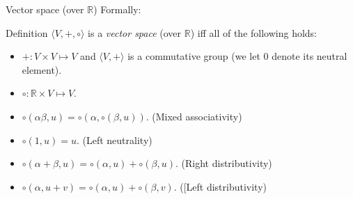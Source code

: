 \documentclass{beamer}
\begin{document}
\begin{frame}{Vector space (over $\mathbb{R}$)}
  Formally:
  
  \begin{block}{Definition}
    $\langle V, {+}, \circ \rangle$ is a \emph{vector space} (over $\mathbb{R}$) iff all of the following holds:
    \begin{itemize}
    \item ${+}: V \times V \mapsto V$ and $\langle V, {+} \rangle$ is a commutative group (we let $0$ denote its neutral element).
    \item ${\circ}: \mathbb{R} \times V \mapsto V$.
    \item $\circ(\alpha \beta, u) = \circ(\alpha, \circ(\beta, u))$. (Mixed associativity)
    \item $\circ(1, u) = u$. (Left neutrality)
    \item $\circ(\alpha + \beta, u) = \circ(\alpha, u) + \circ(\beta, u)$. (Right distributivity)
    \item $\circ(\alpha, u+v) = \circ(\alpha, u) + \circ(\beta, v)$. ([Left distributivity)
    \end{itemize}
  \end{block}
\end{frame}
\end{document}
